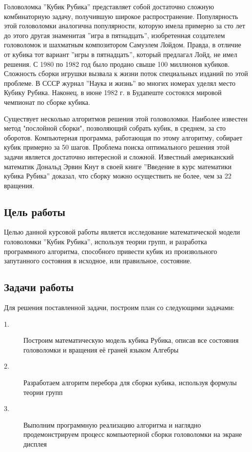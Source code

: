 \documentclass{article}
\begin{document}
Головоломка ''Кубик Рубика'' представляет собой достаточно сложную комбинаторную задачу, получившую широкое распространение. Популярность этой головоломки аналогична популярности, которую имела примерно за сто лет до этого другая знаменитая ''игра в пятнадцать'', изобретенная создателем головоломок и шахматным композитором Самуэлем Лойдом. Правда, в отличие от кубика тот вариант ''игры в пятнадцать'', который предлагал Лойд, не имел решения. С 1980 по 1982 год было продано свыше 100 миллионов кубиков. Сложность сборки игрушки вызвала к жизни поток специальных изданий по этой проблеме. В СССР  журнал ''Наука и жизнь'' во многих номерах уделял место Кубику Рубика. Наконец, в июне 1982 г. в Будапеште состоялся мировой чемпионат по сборке кубика. 

Существует несколько алгоритмов решения этой головоломки. Наиболее известен метод "послойной сборки",  позволяющий собрать кубик, в среднем, за сто оборотов. Компьютерная программа, работающая по этому алгоритму, собирает кубик примерно за 50 шагов. Проблема поиска оптимального  решения этой задачи является достаточно интересной и сложной. Известный американский математик Дональд Эрвин Кнут в своей книге ''Введение в курс математики кубика Рубика'' доказал, что сборку можно осуществить не более, чем за 22 вращения.

\subsection{Цель работы}
Целью данной курсовой работы является исследование математической модели головоломки ''Кубик Рубика'', используя теории групп, и разработка программного алгоритма, способного привести кубик из произвольного запутанного состояния в исходное, или правильное, состояние.

\subsection{Задачи работы}
Для решения поставленной задачи, построим план со следующими задачами:
\begin{description}
\item[1.] Построим математическую модель кубика Рубика, описав все состояния головоломки и вращения её граней языком Алгебры
\item[2.] Разработаем алгоритм перебора для сборки кубика, используя формулы теории групп
\item[3.] Выполним программную реализацию алгоритма и наглядно продемонстрируем процесс компьютерной сборки головоломки на экране дисплея
\end{description}
\end{document}
